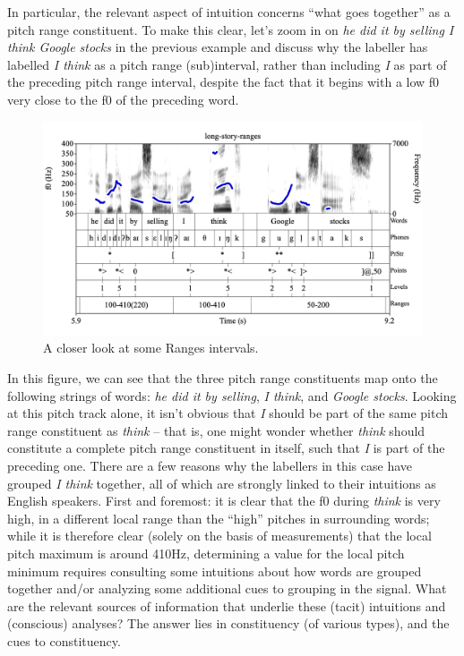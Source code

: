 \documentclass[11pt, twoside]{memoir}
\def\langtext#1{\textit{#1}}
\begin{document}
In particular, the relevant aspect of intuition concerns “what goes together” as a pitch range constituent. To make this clear, let’s zoom in on \langtext{he did it by selling I think Google stocks} in the previous example and discuss why the labeller has labelled \langtext{I think} as a pitch range (sub)interval, rather than including \langtext{I} as part of the preceding pitch range interval, despite the fact that it begins with a low f0 very close to the f0 of the preceding word.

\begin{figure}[H]
\centering
%
\includegraphics[width=.875\linewidth]{Ranges-long-story-ranges-adv-short.png}
%
\caption{A closer look at some Ranges intervals.%
\label{fig:long-story-ranges short Ranges Adv}%
}
\end{figure}

In this figure, we can see that the three pitch range constituents map onto the following strings of words: \langtext{he did it by selling}, \langtext{I think}, and \langtext{Google stocks}. Looking at this pitch track alone, it isn’t obvious that \langtext{I} should be part of the same pitch range constituent as \langtext{think} – that is, one might wonder whether \langtext{think} should constitute a complete pitch range constituent in itself, such that \langtext{I} is part of the preceding one. There are a few reasons why the labellers in this case have grouped \langtext{I think} together, all of which are strongly linked to their intuitions as English speakers. First and foremost: it is clear that the f0 during \langtext{think} is very high, in a different local range than the “high” pitches in surrounding words; while it is therefore clear (solely on the basis of measurements) that the local pitch maximum is around 410Hz, determining a value for the local pitch minimum requires consulting some intuitions about how words are grouped together and/or analyzing some additional cues to grouping in the signal. What are the relevant sources of information that underlie these (tacit) intuitions and (conscious) analyses? The answer lies in constituency (of various types), and the cues to constituency.
\end{document}
